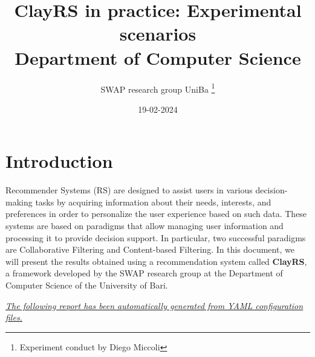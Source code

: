 \documentclass[11pt]{article}
\title{\textbf{ ClayRS in practice: Experimental scenarios }\\ [1cm] Department of Computer Science}
\author{ SWAP research group UniBa \thanks{Experiment conduct by Diego Miccoli}}
\date{19-02-2024}
\begin{document}
\maketitle

\section{Introduction}\label{sec:intro}
Recommender Systems (RS) are designed to assist users in various decision-making tasks by acquiring
information about their needs, interests, and preferences in order to personalize the user experience
based on such data.
These systems are based on paradigms that allow managing user information and processing
it to provide decision support.
In particular, two successful paradigms are Collaborative Filtering and Content-based Filtering.
In this document, we will present the results obtained using a recommendation system called \textbf{ClayRS},
a framework developed by the SWAP research group at the Department of Computer Science of the University of Bari.\\
\hfill\break

\textit{\ul{The following report has been automatically generated from YAML configuration files.}}

\hfill\break
\end{document}
